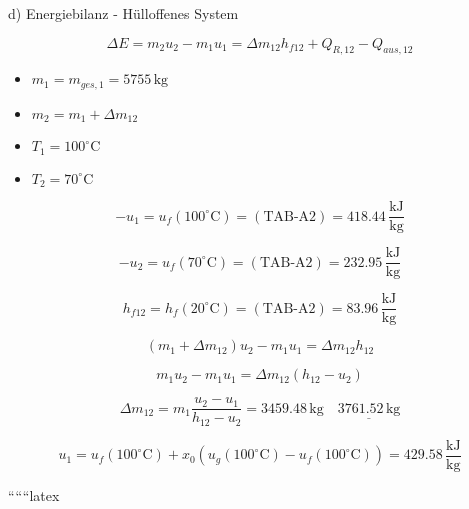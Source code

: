 d) Energiebilanz - Hülloffenes System

\[
\Delta E = m_2 u_2 - m_1 u_1 = \Delta m_{12} h_{f12} + Q_{R,12} - Q_{aus,12}
\]

\begin{itemize}
    \item $m_1 = m_{ges,1} = 5755 \, \text{kg}$
    \item $m_2 = m_1 + \Delta m_{12}$
    \item $T_1 = 100^\circ \text{C}$
    \item $T_2 = 70^\circ \text{C}$
\end{itemize}

\[
-u_1 = u_f (100^\circ \text{C}) = (\text{TAB-A2}) = 418.44 \, \frac{\text{kJ}}{\text{kg}}
\]

\[
-u_2 = u_f (70^\circ \text{C}) = (\text{TAB-A2}) = 232.95 \, \frac{\text{kJ}}{\text{kg}}
\]

\[
h_{f12} = h_f (20^\circ \text{C}) = (\text{TAB-A2}) = 83.96 \, \frac{\text{kJ}}{\text{kg}}
\]

\[
(m_1 + \Delta m_{12}) u_2 - m_1 u_1 = \Delta m_{12} h_{12}
\]

\[
m_1 u_2 - m_1 u_1 = \Delta m_{12} (h_{12} - u_2)
\]

\[
\Delta m_{12} = m_1 \frac{u_2 - u_1}{h_{12} - u_2} = 3459.48 \, \text{kg} \quad \underline{3761.52 \, \text{kg}}
\]

\[
u_1 = u_f (100^\circ \text{C}) + x_0 (u_g (100^\circ \text{C}) - u_f (100^\circ \text{C})) = 429.58 \, \frac{\text{kJ}}{\text{kg}}
\]

``````latex